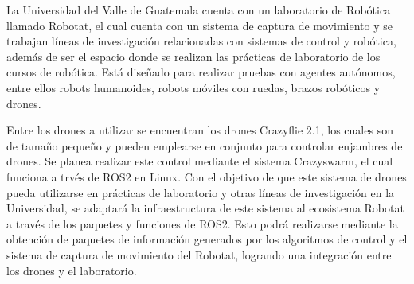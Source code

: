 La Universidad del Valle de Guatemala cuenta con un laboratorio de Robótica llamado Robotat,  el cual cuenta con un sistema de captura de movimiento y se trabajan líneas de investigación relacionadas con sistemas de control y robótica, además de ser el espacio donde se realizan las prácticas de laboratorio de los cursos de robótica. Está diseñado para realizar pruebas con agentes autónomos, entre ellos robots humanoides, robots móviles con ruedas, brazos robóticos y drones.

Entre los drones a utilizar se encuentran los drones Crazyflie 2.1, los cuales son de tamaño pequeño y pueden emplearse en conjunto para controlar enjambres de drones. Se planea realizar este control mediante el sistema Crazyswarm, el cual funciona a trvés de ROS2 en Linux. Con el objetivo de que este sistema de drones pueda utilizarse en prácticas de laboratorio y otras líneas de investigación en la Universidad, se adaptará la infraestructura de este sistema al ecosistema Robotat a través de los paquetes y funciones de ROS2. Esto podrá realizarse mediante la obtención de paquetes de información generados por los algoritmos de control y el sistema de captura de movimiento del Robotat, logrando una integración entre los drones y el laboratorio.